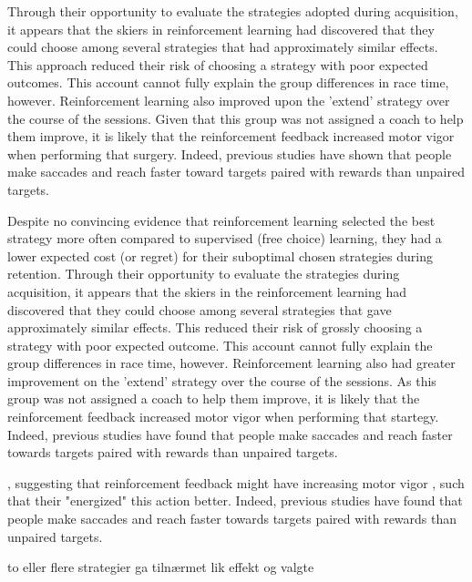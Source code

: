 Through their opportunity to evaluate the strategies adopted during acquisition, it appears that the skiers in reinforcement learning had discovered that they could choose among several strategies that had approximately similar effects. This approach reduced their risk of choosing a strategy with poor expected outcomes. This account cannot fully explain the group differences in race time, however. Reinforcement learning also improved upon the 'extend' strategy over the course of the sessions. Given that this group was not assigned a coach to help them improve, it is likely that the reinforcement feedback increased motor vigor when performing that surgery. Indeed, previous studies have shown that people make saccades \cite{takikawa_modulation_2002} and reach\cite{summerside_vigor_2018} faster toward targets paired with rewards than unpaired targets.


Despite no convincing evidence that reinforcement learning selected the best strategy more often compared to supervised (free choice) learning, they had a lower expected cost (or regret) for their suboptimal chosen strategies during retention. Through their opportunity to evaluate the strategies during acquisition, it appears that the skiers in the reinforcement learning had discovered that they could choose among several strategies that gave approximately similar effects. This reduced their risk of grossly choosing a strategy with poor expected outcome. This account cannot fully explain the group differences in race time, however. Reinforcement learning also had greater improvement on the 'extend' strategy over the course of the sessions. As this group was not assigned a coach to help them improve, it is likely that the reinforcement feedback increased motor vigor when performing that startegy.  Indeed, previous studies have found that people make saccades \cite{takikawa_modulation_2002} and reach\cite{summerside_vigor_2018} faster towards targets paired with rewards than unpaired targets. 




, suggesting that reinforcement feedback might have increasing motor vigor \cite{pietro_mazzoni_why_2007, dudman_basal_2016}, such that their "energized" this action better. Indeed, previous studies have found that people make saccades \cite{takikawa_modulation_2002} and reach\cite{summerside_vigor_2018} faster towards targets paired with rewards than unpaired targets. 





to eller flere strategier ga tilnærmet lik effekt og valgte 



